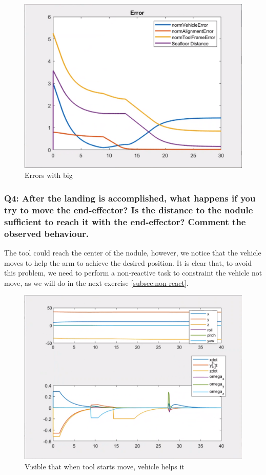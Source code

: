 \documentclass{article}
\begin{document}
\begin{figure}[htpb]
\begin{minipage}{0.40\textwidth}
\includegraphics[width=\textwidth]{313_b_Errors.png}
\caption{Errors with big}\label{err_w_b} 
\end{minipage}
\end{figure}

\clearpage 
\subsubsection{Q4: After the landing is accomplished, what happens if you try to move the end-effector? Is the distance to the nodule sufficient to reach it with the end-effector? Comment the observed behaviour.}\label{ex3}
The tool could reach the center of the nodule, however, we notice that the vehicle moves to help the arm to achieve the desired position. It is clear that, to avoid this problem, we need to perform a non-reactive task to constraint the vehicle not move, as we will do in the next exercise \ref{subsec:non-react}. 

\begin{figure}[h]
    \centering
    \includegraphics[scale=0.4]{314_ppdot.png}
    \caption{Visible that when tool starts move, vehicle helps it}
    \label{graphes3}
\end{figure}
\end{document}
